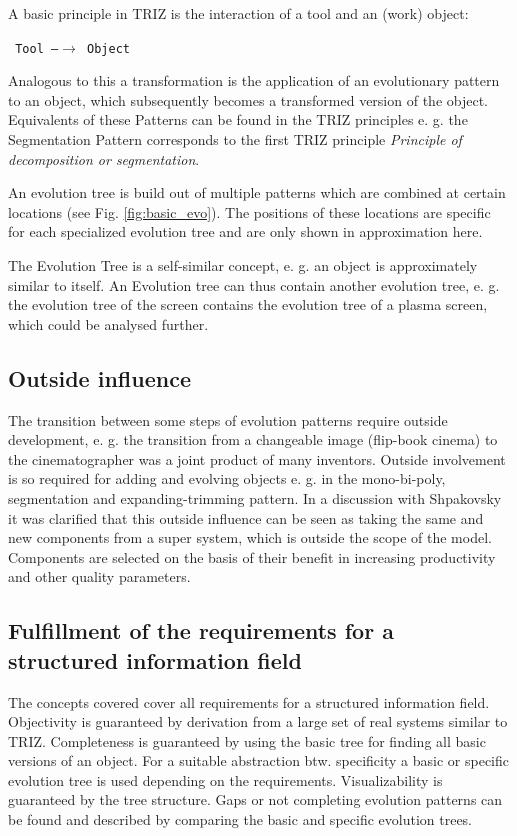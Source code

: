 \documentclass[11pt,a4paper]{article}
\begin{document}
A basic principle in TRIZ is the interaction of a tool and an (work) object:

\begin{center}\tt
  Tool \textrm{---}$\to$ Object
\end{center}

Analogous to this a transformation is the application of an evolutionary pattern to an object, which subsequently becomes a transformed version of the object. Equivalents of these Patterns can be found in the TRIZ principles e. g. the Segmentation Pattern corresponds to the first TRIZ principle \textit{Principle of decomposition or segmentation}.

An evolution tree is build out of multiple patterns which are combined at certain locations (see Fig. \ref{fig:basic_evo}). The positions of these locations are specific for each specialized evolution tree and are only shown in approximation here. 

The Evolution Tree is a self-similar concept, e. g. an object is approximately similar to itself. An Evolution tree can thus contain another evolution tree, e. g. the evolution tree of the screen contains the evolution tree of a plasma screen, which could be analysed further.

\subsection{Outside influence}

The transition between some steps of evolution patterns require outside development, e. g. the transition from a changeable image (flip-book cinema) to the cinematographer was a joint product of many inventors. Outside involvement is so required for adding and evolving objects e. g. in the mono-bi-poly, segmentation and expanding-trimming pattern.
In a discussion with Shpakovsky it was clarified that this outside influence can be seen as taking the same and new components from a super system, which is outside the scope of the model. Components are selected on the basis of their benefit in increasing productivity and other quality parameters.

\subsection{Fulfillment of the requirements for a structured information field}

The concepts covered cover all requirements for a structured information field. Objectivity is guaranteed by derivation from a large set of real systems similar to TRIZ. Completeness is guaranteed by using the basic tree for finding all basic versions of an object. For a suitable abstraction btw. specificity a basic or specific evolution tree is used depending on the requirements. Visualizability is guaranteed by the tree structure. Gaps or not completing evolution patterns can be found and described by comparing the basic and specific evolution trees.
\end{document}
